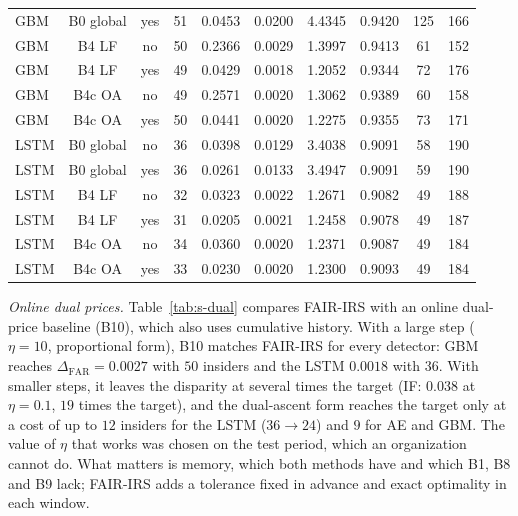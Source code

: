 \documentclass[10pt,onecolumn,letterpaper]{article}
\newcommand{\FAR}{\mathrm{FAR}}
\begin{document}
\begin{table}[!t]
{\begin{tabular}{lccccccccc}
GBM & B0 global & yes & 51 & 0.0453 & 0.0200 & 4.4345 & 0.9420 & 125 & 166 \\
GBM & B4 LF & no & 50 & 0.2366 & 0.0029 & 1.3997 & 0.9413 & 61 & 152 \\
GBM & B4 LF & yes & 49 & 0.0429 & 0.0018 & 1.2052 & 0.9344 & 72 & 176 \\
GBM & B4c OA & no & 49 & 0.2571 & 0.0020 & 1.3062 & 0.9389 & 60 & 158 \\
GBM & B4c OA & yes & 50 & 0.0441 & 0.0020 & 1.2275 & 0.9355 & 73 & 171 \\
LSTM & B0 global & no & 36 & 0.0398 & 0.0129 & 3.4038 & 0.9091 & 58 & 190 \\
LSTM & B0 global & yes & 36 & 0.0261 & 0.0133 & 3.4947 & 0.9091 & 59 & 190 \\
LSTM & B4 LF & no & 32 & 0.0323 & 0.0022 & 1.2671 & 0.9082 & 49 & 188 \\
LSTM & B4 LF & yes & 31 & 0.0205 & 0.0021 & 1.2458 & 0.9078 & 49 & 187 \\
LSTM & B4c OA & no & 34 & 0.0360 & 0.0020 & 1.2371 & 0.9087 & 49 & 184 \\
LSTM & B4c OA & yes & 33 & 0.0230 & 0.0020 & 1.2300 & 0.9093 & 49 & 184 \\
\bottomrule
\end{tabular}}
\end{table}

\emph{Online dual prices.} Table~\ref{tab:s-dual} compares FAIR-IRS with an online dual-price baseline (B10), which also uses cumulative history. With a large step ($\eta=10$, proportional form), B10 matches FAIR-IRS for every detector: GBM reaches $\Delta_{\FAR}=0.0027$ with $50$ insiders and the LSTM $0.0018$ with $36$. With smaller steps, it leaves the disparity at several times the target (IF: $0.038$ at $\eta=0.1$, $19$ times the target), and the dual-ascent form reaches the target only at a cost of up to $12$ insiders for the LSTM ($36\to24$) and $9$ for AE and GBM. The value of $\eta$ that works was chosen on the test period, which an organization cannot do. What matters is memory, which both methods have and which B1, B8 and B9 lack; FAIR-IRS adds a tolerance fixed in advance and exact optimality in each window.
\end{document}
